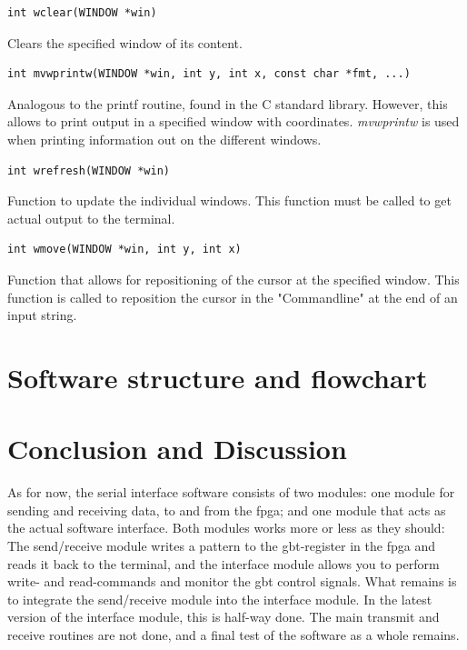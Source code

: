 \documentclass[main.tex]{subfiles}
\begin{document}
\begin{lstlisting}[frame=single] 
int wclear(WINDOW *win)
\end{lstlisting}

Clears the specified window of its content. \\

\begin{lstlisting}[frame=single] 
int mvwprintw(WINDOW *win, int y, int x, const char *fmt, ...)
\end{lstlisting}

Analogous to the printf routine, found in the C standard library. However, this allows to print output in a specified window with coordinates. \textit{mvwprintw} is used when printing information out on the different windows. \\

\begin{lstlisting}[frame=single] 
int wrefresh(WINDOW *win)
\end{lstlisting}

Function to update the individual windows. This function must be called to get actual output to the terminal. \\

\begin{lstlisting}[frame=single] 
int wmove(WINDOW *win, int y, int x)
\end{lstlisting}

Function that allows for repositioning of the cursor at the specified window. This function is called to reposition the cursor in the "Commandline" at the end of an input string.

\section{Software structure and flowchart}

\section{Conclusion and Discussion}

As for now, the serial interface software consists of two modules: one module for sending and receiving data, to and from the \gls{fpga}; and one module that acts as the actual software interface. Both modules works more or less as they should: The send/receive module writes a pattern to the \gls{gbt}-register in the \gls{fpga} and reads it back to the terminal, and the interface module allows you to perform write- and read-commands and monitor the \gls{gbt} control signals. What remains is to integrate the send/receive module into the interface module. In the latest version of the interface module, this is half-way done. The main transmit and receive routines are not done, and a final test of the software as a whole remains.
\end{document}
